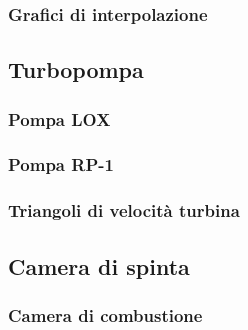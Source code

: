 \subsubsection{Grafici di interpolazione}


\subsection{Turbopompa}





\subsubsection{Pompa LOX}


\subsubsection{Pompa RP-1}


\subsubsection{Triangoli di velocità turbina}


\subsection{Camera di spinta}

\subsubsection{Camera di combustione}


